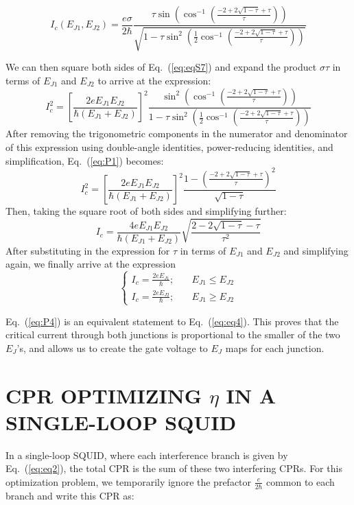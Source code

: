 \documentclass[%
 reprint,
 amsmath,amssymb,
 aps,
]{revtex4-2}
\begin{document}
\begin{equation}
    \label{eq:eqS7}
    I_c(E_{J1},E_{J2})=\frac{e\sigma}{2\hbar}\frac{\tau \sin(\cos^{-1}(\frac{-2+2\sqrt{1-\tau}+\tau}{\tau}))}{\sqrt{1-\tau \sin^2(\frac{1}{2}\cos^{-1}(\frac{-2+2\sqrt{1-\tau}+\tau}{\tau}))}}  
\end{equation}

We can then square both sides of Eq.~(\ref{eq:eqS7}) and expand the product $\sigma \tau$ in terms of $E_{J1}$ and $E_{J2}$ to arrive at the expression:
\begin{equation}
    \label{eq:P1}
    I_c^2=\left[\frac{2eE_{J1}E_{J2}}{\hbar(E_{J1}+E_{J2})}\right]^2\frac{\sin^2\left(\cos^{-1}\left(\frac{-2+2\sqrt{1-\tau}+\tau}{\tau}\right)\right)}{1-\tau \sin^2\left(\frac{1}{2}\cos^{-1}\left(\frac{-2+2\sqrt{1-\tau}+\tau}{\tau}\right)\right)}
\end{equation}
After removing the trigonometric components in the numerator and denominator of this expression using double-angle identities, power-reducing identities, and simplification, Eq.~(\ref{eq:P1}) becomes:
\begin{equation}
    \label{eq:P2}
    I_c^2=\left[\frac{2eE_{J1}E_{J2}}{\hbar(E_{J1}+E_{J2})}\right]^2\frac{1-\left(\frac{-2+2\sqrt{1-\tau}+\tau}{\tau}\right)^2}{\sqrt{1-\tau}}
\end{equation}
Then, taking the square root of both sides and simplifying further:
\begin{equation}
    \label{eq:P3}
    I_c = \frac{4eE_{J1}E_{J2}}{\hbar(E_{J1}+E_{J2})}\sqrt{\frac{2-2\sqrt{1-\tau}-\tau}{\tau^2}}
\end{equation}
After substituting in the expression for $\tau$ in terms of $E_{J1}$ and $E_{J2}$ and simplifying again, we finally arrive at the expression
\begin{equation}
    \label{eq:P4}
    \begin{cases}
        I_c = \frac{2eE_{J1}}{\hbar};\quad & E_{J1} \leq E_{J2} \\

        I_c = \frac{2eE_{J2}}{\hbar};\quad & E_{J1} \geq E_{J2}
    \end{cases}
\end{equation}

Eq.~(\ref{eq:P4}) is an equivalent statement to Eq.~(\ref{eq:eq4}). This proves that the critical current through both junctions is proportional to the smaller of the two $E_J$'s, and allows us to create the gate voltage to $E_J$ maps for each junction.

\section{CPR OPTIMIZING $\eta$ IN A SINGLE-LOOP SQUID}
\label{app:appD}
In a single-loop SQUID, where each interference branch is given by Eq.~(\ref{eq:eq2}), the total CPR is the sum of these two interfering CPRs. For this optimization problem, we temporarily ignore the prefactor $\frac{e}{2\hbar}$ common to each branch and write this CPR as:
\end{document}
